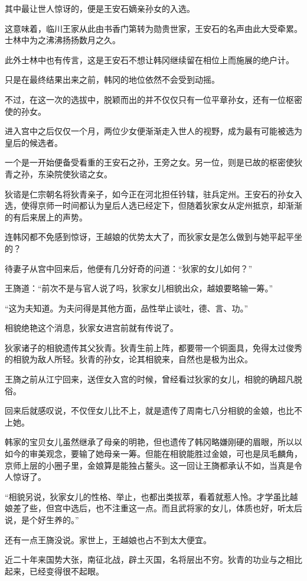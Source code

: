 其中最让世人惊讶的，便是王安石嫡亲孙女的入选。

这意味着，临川王家从此由书香门第转为勋贵世家，王安石的名声由此大受牵累。士林中为之沸沸扬扬数月之久。

此外士林中也有传言，这是王安石不想让韩冈继续留在相位上而施展的绝户计。

只是在最终结果出来之前，韩冈的地位依然不会受到动摇。

不过，在这一次的选拔中，脱颖而出的并不仅仅只有一位平章孙女，还有一位枢密使的孙女。

进入宫中之后仅仅一个月，两位少女便渐渐走入世人的视野，成为最有可能被选为皇后的候选者。

一个是一开始便备受看重的王安石之孙，王旁之女。另一位，则是已故的枢密使狄青之孙，东染院使狄谘之女。

狄谘是仁宗朝名将狄青亲子，如今正在河北担任钤辖，驻兵定州。王安石的孙女入选，使得京师一时间都认为皇后人选已经定下，但随着狄家女从定州抵京，却渐渐的有后来居上的声势。

连韩冈都不免感到惊讶，王越娘的优势太大了，而狄家女是怎么做到与她平起平坐的？

待妻子从宫中回来后，他便有几分好奇的问道：“狄家的女儿如何？”

王旖道：“前次不是与官人说了吗，狄家女儿相貌出众，越娘要略输一筹。”

“这为夫知道。为夫问得是其他方面，品性举止谈吐，德、言、功。”

相貌绝艳这个消息，狄家女进宫前就有传说了。

狄家诸子的相貌遗传其父狄青。狄青生前上阵，都要带一个铜面具，免得太过俊秀的相貌为敌人所轻。狄青的孙女，论其相貌来，自然也是极为出众。

王旖之前从江宁回来，送侄女入宫的时候，曾经看过狄家的女儿，相貌的确超凡脱俗。

回来后就感叹说，不仅侄女儿比不上，就是遗传了周南七八分相貌的金娘，也比不上她。

韩家的宝贝女儿虽然继承了母亲的明艳，但也遗传了韩冈略嫌刚硬的眉眼，所以以如今的审美观念，要输了她母亲一筹。但能在相貌能胜过金娘，可也是凤毛麟角，京师上层的小圈子里，金娘算是能独占鳌头。这一回让王旖都承认不如，当真是令人惊讶了。

“相貌另说，狄家女儿的性格、举止，也都出类拔萃，看着就惹人怜。才学虽比越娘差了些，但宫中选后，也不注重这一点。而且武将家的女儿，体质也好，听太后说，是个好生养的。”

还有一点王旖没说。家世上，王越娘也占不到太大便宜。

近二十年来国势大张，南征北战，辟土灭国，名将层出不穷。狄青的功业与之相比起来，已经变得很不起眼。

